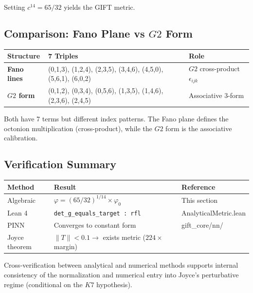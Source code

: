 \documentclass[11pt,a4paper]{article}
\newcommand{\Gtwo}{\mathrm{G}_2}
\newcommand{\Kseven}{K_7}
\def\Gtwo{G2}%
\def\Kseven{K7}%
\begin{document}
Setting $c^{14} = 65/32$ yields the GIFT metric.

\subsection{Comparison: Fano Plane vs $\Gtwo$ Form}

\begin{table}[H]
\centering
\small
\begin{tabular}{lll}
\toprule
Structure & 7 Triples & Role \\
\midrule
\textbf{Fano lines} & (0,1,3), (1,2,4), (2,3,5), (3,4,6), (4,5,0), (5,6,1), (6,0,2) & $\Gtwo$ cross-product $\epsilon_{ijk}$ \\
\textbf{$\Gtwo$ form} & (0,1,2), (0,3,4), (0,5,6), (1,3,5), (1,4,6), (2,3,6), (2,4,5) & Associative 3-form \\
\bottomrule
\end{tabular}
\end{table}

Both have 7 terms but different index patterns. The Fano plane defines the octonion multiplication (cross-product), while the $\Gtwo$ form is the associative calibration.

\subsection{Verification Summary}

\begin{table}[H]
\centering
\begin{tabular}{lll}
\toprule
Method & Result & Reference \\
\midrule
Algebraic & $\varphi = (65/32)^{1/14} \times \varphi_0$ & This section \\
Lean 4 & \texttt{det\_g\_equals\_target : rfl} & AnalyticalMetric.lean \\
PINN & Converges to constant form & gift\_core/nn/ \\
Joyce theorem & $\|T\| < 0.1 \to$ exists metric ($224\times$ margin) & \cite{joyce2000} \\
\bottomrule
\end{tabular}
\end{table}

Cross-verification between analytical and numerical methods supports internal consistency of the normalization and numerical entry into Joyce's perturbative regime (conditional on the $\Kseven$ hypothesis).
\end{document}
